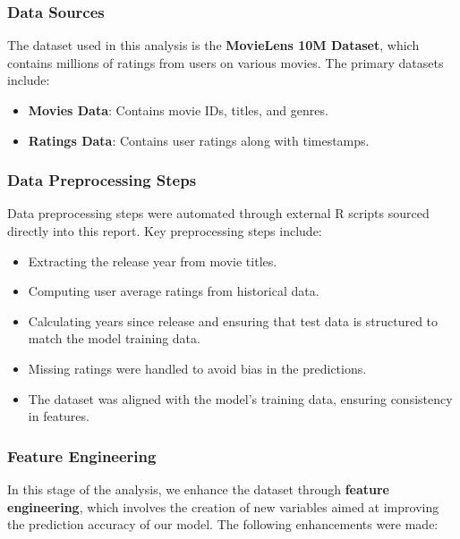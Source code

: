 \documentclass[
]{article}
\begin{document}
\subsubsection{Data Sources}\label{data-sources}

The dataset used in this analysis is the \textbf{MovieLens 10M Dataset},
which contains millions of ratings from users on various movies. The
primary datasets include:

\begin{itemize}
\item
  \textbf{Movies Data}: Contains movie IDs, titles, and genres.
\item
  \textbf{Ratings Data}: Contains user ratings along with timestamps.
\end{itemize}

\subsubsection{Data Preprocessing Steps}\label{data-preprocessing-steps}

Data preprocessing steps were automated through external R scripts
sourced directly into this report. Key preprocessing steps include:

\begin{itemize}
\item
  Extracting the release year from movie titles.
\item
  Computing user average ratings from historical data.
\item
  Calculating years since release and ensuring that test data is
  structured to match the model training data.
\item
  Missing ratings were handled to avoid bias in the predictions.
\item
  The dataset was aligned with the model's training data, ensuring
  consistency in features.
\end{itemize}

\subsubsection{Feature Engineering}\label{feature-engineering}

In this stage of the analysis, we enhance the dataset through
\textbf{feature engineering}, which involves the creation of new
variables aimed at improving the prediction accuracy of our model. The
following enhancements were made:
\end{document}
